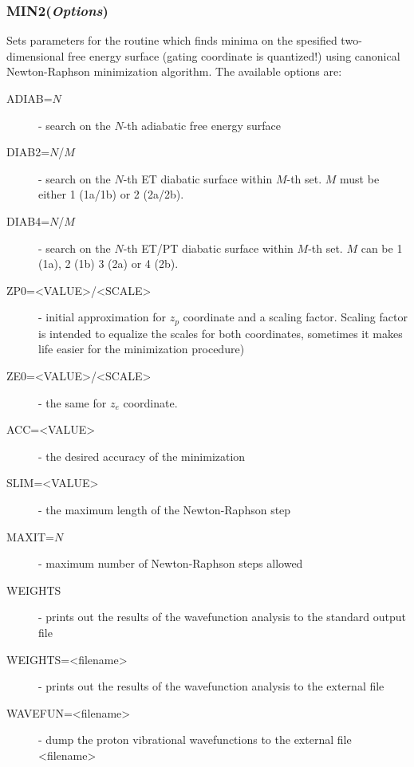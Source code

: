 \documentclass[oneside,11pt,openany]{book}
\newcommand{\tw}{\ttfamily}
\begin{document}
\subsubsection*{MIN2({\it Options})}
%
Sets parameters for the routine which finds minima
on the spesified two-dimensional free energy surface
(gating coordinate is quantized!) using canonical
Newton-Raphson minimization algorithm.
The available options are:
%
\begin{description}
%
\item[{\tw ADIAB=$N$}] - search on the $N$-th adiabatic free energy surface

\item[{\tw DIAB2=$N$/$M$}] - search on the $N$-th ET diabatic surface
	    within $M$-th set. $M$ must be either 1 (1a/1b)
	    or 2 (2a/2b).

\item[{\tw DIAB4=$N$/$M$}] - search on the $N$-th ET/PT diabatic surface
	    within $M$-th set. $M$ can be 1 (1a), 2 (1b)
	    3 (2a) or 4 (2b).

\item[{\tw ZP0=<VALUE>/<SCALE>}] - initial approximation for $z_p$ coordinate
		      and a scaling factor. Scaling factor
		      is intended to equalize the scales for
		      both coordinates, sometimes it makes
		      life easier for the minimization
		      procedure)

\item[{\tw ZE0=<VALUE>/<SCALE>}] - the same for $z_e$ coordinate.

\item[{\tw ACC=<VALUE>}] - the desired accuracy of the minimization

\item[{\tw SLIM=<VALUE>}] - the maximum length of the Newton-Raphson step

\item[{\tw MAXIT=$N$}]  - maximum number of Newton-Raphson steps allowed

\item[{\tw WEIGHTS}] - prints out the results of the wavefunction analysis
	  to the standard output file

\item[{\tw WEIGHTS=<filename>}] - prints out the results of the wavefunction
		     analysis to the external file

\item[{\tw WAVEFUN=<filename>}] - dump the proton vibrational wavefunctions
		     to the external file <filename>
%
\end{description}
\end{document}
